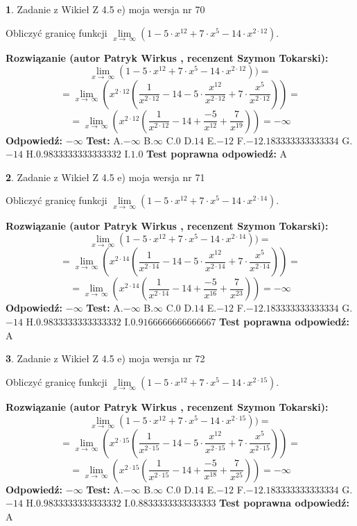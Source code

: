 \documentclass[12pt, a4paper]{article}
\theoremstyle{definition} %
\newtheorem{zad}{}
\newcommand{\zadStart}[1]{\begin{zad}#1\newline}
\newcommand{\zadStop}{\end{zad}}
\newcommand{\rozwStart}[2]{\noindent \textbf{Rozwiązanie (autor #1 , recenzent #2): }\newline}
\newcommand{\rozwStop}{\newline}
\newcommand{\odpStart}{\noindent \textbf{Odpowiedź:}\newline}
\newcommand{\odpStop}{\newline}
\newcommand{\testStart}{\noindent \textbf{Test:}\newline}
\newcommand{\testStop}{\newline}
\newcommand{\kluczStart}{\noindent \textbf{Test poprawna odpowiedź:}\newline}
\newcommand{\kluczStop}{\newline}
\begin{document}
\zadStart{Zadanie z Wikieł Z 4.5 e) moja wersja nr 70}


Obliczyć granicę funkcji  $\lim\limits_{x\to\ \infty}(1 - 5 \cdot x^{12}+7 \cdot x^{5}- 14 \cdot x^{2\cdot12})$.
\zadStop
\rozwStart{Patryk Wirkus}{Szymon Tokarski}
$$\lim\limits_{x\to\ \infty}(1 - 5 \cdot x^{12}+7 \cdot x^{5}- 14 \cdot x^{2\cdot12}))=$$
$$=\lim\limits_{x\to\ \infty}(x^{2\cdot12}(\frac{1}{x^{2\cdot12}}-14 -5 \cdot \frac{x^{12}}{x^{2\cdot12}}+7 \cdot \frac{x^{5}}{x^{2\cdot12}}))=$$
$$=\lim\limits_{x\to\ \infty}(x^{2\cdot12}(\frac{1}{x^{2\cdot12}}-14 + \frac{-5}{x^{12}}+ \frac{7}{x^{19}}))=-\infty$$
\rozwStop
\odpStart
$-\infty$
\odpStop
\testStart
A.$-\infty$ B.$\infty$ C.$0$ D.$14$ E.$-12$
F.$-12.183333333333334$ G.$-14$
H.$0.9833333333333332$
I.$1.0$
\testStop
\kluczStart
A
\kluczStop



\zadStart{Zadanie z Wikieł Z 4.5 e) moja wersja nr 71}


Obliczyć granicę funkcji  $\lim\limits_{x\to\ \infty}(1 - 5 \cdot x^{12}+7 \cdot x^{5}- 14 \cdot x^{2\cdot14})$.
\zadStop
\rozwStart{Patryk Wirkus}{Szymon Tokarski}
$$\lim\limits_{x\to\ \infty}(1 - 5 \cdot x^{12}+7 \cdot x^{5}- 14 \cdot x^{2\cdot14}))=$$
$$=\lim\limits_{x\to\ \infty}(x^{2\cdot14}(\frac{1}{x^{2\cdot14}}-14 -5 \cdot \frac{x^{12}}{x^{2\cdot14}}+7 \cdot \frac{x^{5}}{x^{2\cdot14}}))=$$
$$=\lim\limits_{x\to\ \infty}(x^{2\cdot14}(\frac{1}{x^{2\cdot14}}-14 + \frac{-5}{x^{16}}+ \frac{7}{x^{23}}))=-\infty$$
\rozwStop
\odpStart
$-\infty$
\odpStop
\testStart
A.$-\infty$ B.$\infty$ C.$0$ D.$14$ E.$-12$
F.$-12.183333333333334$ G.$-14$
H.$0.9833333333333332$
I.$0.9166666666666667$
\testStop
\kluczStart
A
\kluczStop



\zadStart{Zadanie z Wikieł Z 4.5 e) moja wersja nr 72}


Obliczyć granicę funkcji  $\lim\limits_{x\to\ \infty}(1 - 5 \cdot x^{12}+7 \cdot x^{5}- 14 \cdot x^{2\cdot15})$.
\zadStop
\rozwStart{Patryk Wirkus}{Szymon Tokarski}
$$\lim\limits_{x\to\ \infty}(1 - 5 \cdot x^{12}+7 \cdot x^{5}- 14 \cdot x^{2\cdot15}))=$$
$$=\lim\limits_{x\to\ \infty}(x^{2\cdot15}(\frac{1}{x^{2\cdot15}}-14 -5 \cdot \frac{x^{12}}{x^{2\cdot15}}+7 \cdot \frac{x^{5}}{x^{2\cdot15}}))=$$
$$=\lim\limits_{x\to\ \infty}(x^{2\cdot15}(\frac{1}{x^{2\cdot15}}-14 + \frac{-5}{x^{18}}+ \frac{7}{x^{25}}))=-\infty$$
\rozwStop
\odpStart
$-\infty$
\odpStop
\testStart
A.$-\infty$ B.$\infty$ C.$0$ D.$14$ E.$-12$
F.$-12.183333333333334$ G.$-14$
H.$0.9833333333333332$
I.$0.8833333333333333$
\testStop
\kluczStart
A
\kluczStop
\end{document}
